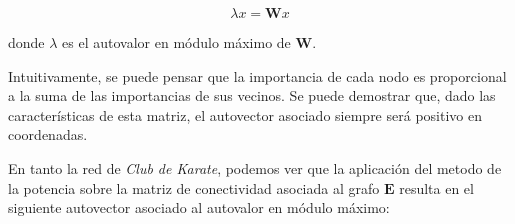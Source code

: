 \vspace{1em}
\begin{equation} \label{conectividad}
    \lambda x = \mathbf{W} x
\end{equation}

\vspace{1em}
\noindent donde $\lambda$ es el autovalor en módulo máximo de \textbf{W}.

\vspace{1em}
Intuitivamente, se puede pensar que la importancia de cada nodo es proporcional a la suma de las importancias de sus vecinos. Se puede demostrar  \cite{Newman} que, dado las características de esta matriz, el autovector asociado siempre será positivo en coordenadas.

\vspace{1em}
En tanto la red de \textit{Club de Karate}, podemos ver que la aplicación del metodo de la potencia sobre la matriz de conectividad asociada al grafo $\mathbf{E}$ resulta en el siguiente autovector asociado al autovalor en módulo máximo:

